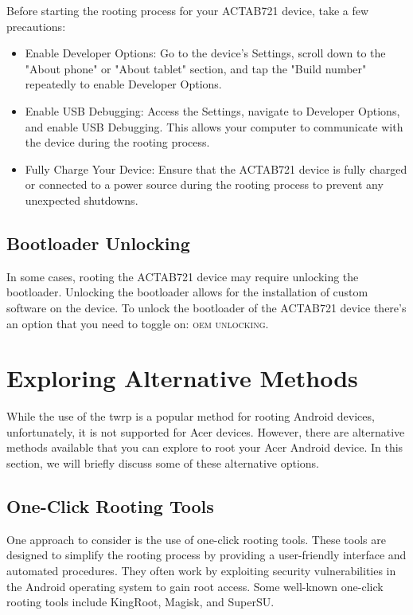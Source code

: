 Before starting the rooting process for your ACTAB721 device, take a few precautions:

\begin{itemize}
  \item Enable Developer Options: Go to the device's Settings, scroll down to the "About phone" or "About tablet" section, and tap the "Build number" repeatedly to enable Developer Options.
  \item Enable USB Debugging: Access the Settings, navigate to Developer Options, and enable USB Debugging. This allows your computer to communicate with the device during the rooting process.
  \item Fully Charge Your Device: Ensure that the ACTAB721 device is fully charged or connected to a power source during the rooting process to prevent any unexpected shutdowns.
\end{itemize}

\subsection{Bootloader Unlocking}

In some cases, rooting the ACTAB721 device may require unlocking the bootloader. Unlocking the bootloader allows for the installation of custom software on the device. To unlock the bootloader of the ACTAB721 device there's an option that you need to toggle on: \faToggleOn \textsc{oem unlocking}.

\section{Exploring Alternative Methods}{\faCaretRight}
While the use of the \gls{twrp} is a popular method for rooting Android devices, unfortunately, it is not supported for Acer devices. However, there are alternative methods available that you can explore to root your Acer Android device. In this section, we will briefly discuss some of these alternative options.

\subsection{One-Click Rooting Tools}

One approach to consider is the use of one-click rooting tools. These tools are designed to simplify the rooting process by providing a user-friendly interface and automated procedures. They often work by exploiting security vulnerabilities in the Android operating system to gain root access. Some well-known one-click rooting tools include KingRoot, Magisk, and SuperSU.

